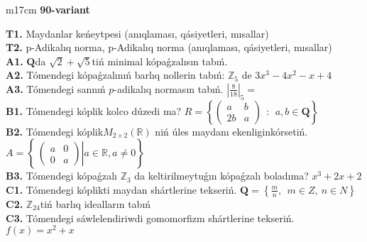 \documentclass{article}
\begin{document}
\begin{tabular}{m{17cm}}
\textbf{90-variant}
\newline

\textbf{T1.} Maydanlar keńeytpesi (anıqlaması, qásiyetleri, mısallar) \\
\textbf{T2.} p-Adikalıq norma, p-Adikalıq norma (anıqlaması, qásiyetleri, mısallar) \\
\textbf{A1.} \(\mathbf{Q}\)da \(\sqrt{2} + \sqrt{5}\)tiń minimal kópaǵzalısın tabıń. \\
\textbf{A2.} Tómendegi kópaǵzalınıń barlıq nollerin tabıń: \(\mathbb{Z}_{5}\) de \(3x^{3} - 4x^{2} - x + 4\) \\
\textbf{A3.} Tómendegi sannıń \(p\)-adikalıq normasın tabıń. \(|\frac{8}{18}|_{5} =\) \\
\textbf{B1.} Tómendegi kóplik kolco dúzedi ma? \(R = \left\{ \begin{pmatrix}
a & b \\
2b & a
\end{pmatrix}\ \ :\ \ a,b \in \mathbf{Q} \right\}\) \\
\textbf{B2.} Tómendegi kóplik\(M_{2 \times 2}\left( \mathbb{R} \right)\) niń úles maydanı ekenliginkórsetiń. \(A = \left\{ \left. \ \begin{pmatrix}
a & 0 \\
0 & a
\end{pmatrix} \right|a\mathbb{\in R},a \neq 0 \right\}\) \\
\textbf{B3.} Tómendegi kópaǵzalı \(\mathbb{Z}_{3}\) da keltirilmeytuǵın kópaǵzalı boladıma? \(x^{3} + 2x + 2\) \\
\textbf{C1.} Tómendegi kóplikti maydan shártlerine tekseriń. \(\mathbf{Q} = \left\{ \frac{m}{n},\ \ m \in Z,\ n \in N \right\}\) \\
\textbf{C2.} \(\mathbb{Z}_{24}\)tiń barlıq idealların tabıń \\
\textbf{C3.} Tómendegi sáwlelendiriwdi gomomorfizm shártlerine tekseriń. \(f(x) = x^{2} + x\) \\

\end{tabular}
\vspace{1cm}
\end{document}
